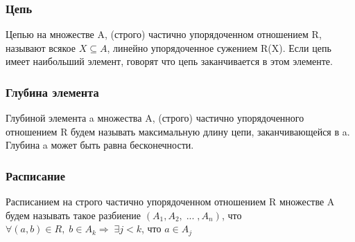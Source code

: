 \subsubsection{Цепь}
Цепью на множестве A, (строго) частично упорядоченном отношением R, называют всякое $X \subseteq A$, линейно упорядоченное сужением R(X). Если цепь имеет наибольший элемент, говорят что цепь заканчивается в этом элементе.
\subsubsection{Глубина элемента}
Глубиной элемента a множества A, (строго) частично упорядоченного отношением R будем называть максимальную длину цепи, заканчивающейся в a. Глубина a может быть равна бесконечности.
\subsubsection{Расписание}
Расписанием на строго частично упорядоченном отношением R множестве A будем называть такое разбиение $(A_1, A_2, \; ... \;, A_n)$, что $\forall (a, b) \in R, \; b \in A_k \Rightarrow \; \exists j < k$, что $a \in A_j$ 
